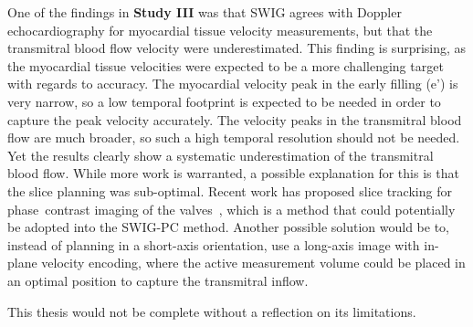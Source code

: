 One of the findings in \textbf{Study III} was that SWIG agrees with Doppler echocardiography for myocardial tissue velocity measurements, but that the transmitral blood flow velocity were underestimated. This finding is surprising, as the myocardial tissue velocities were expected to be a more challenging target with regards to accuracy. The myocardial velocity peak in the early filling (e') is very narrow, so a low temporal footprint is expected to be needed in order to capture the peak velocity accurately. The velocity peaks in the transmitral blood flow are much broader, so such a high temporal resolution should not be needed. Yet the results clearly show a systematic underestimation of the transmitral blood flow. While more work is warranted, a possible explanation for this is that the slice planning was sub-optimal. Recent work has proposed slice tracking for phase~contrast imaging of the valves~\cite{Seemann2019}, which is a method that could potentially be adopted into the SWIG-PC method. Another possible solution would be to, instead of planning in a short-axis orientation, use a long-axis image with in-plane velocity encoding, where the active measurement volume could be placed in an optimal position to capture the transmitral inflow. 

This thesis would not be complete without a reflection on its limitations. 

